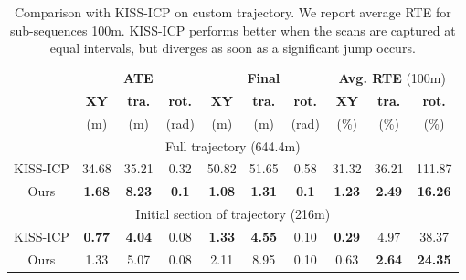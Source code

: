 \begin{table}[h]
    \centering
    {\small
        \begin{tabular}{c|ccc|ccc|ccc}
            \hline
                     & \multicolumn{3}{c|}{\textbf{ATE}} & \multicolumn{3}{c|}{\textbf{Final}} & \multicolumn{3}{c}{\textbf{Avg. RTE} (100m)}                                                                                                  \\
                     & \textbf{XY}                       & \textbf{tra.}                       & \textbf{rot.}                                & \textbf{XY}   & \textbf{tra.} & \textbf{rot.} & \textbf{XY}   & \textbf{tra.} & \textbf{rot.}  \\
                     & (m)                               & (m)                                 & (rad)                                        & (m)           & (m)           & (rad)         & (\%)          & (\%)          & (\%)           \\
            \hline
            \multicolumn{10}{c}{Full trajectory (644.4m)}                                                                                                                                                                                      \\
            \hline
            KISS-ICP & 34.68                             & 35.21                               & 0.32                                         & 50.82         & 51.65         & 0.58          & 31.32         & 36.21         & 111.87         \\
            Ours     & \textbf{1.68}                     & \textbf{8.23}                       & \textbf{0.1}                                 & \textbf{1.08} & \textbf{1.31} & \textbf{0.1}  & \textbf{1.23} & \textbf{2.49} & \textbf{16.26} \\
            \hline
            \multicolumn{10}{c}{Initial section of trajectory (216m)}                                                                                                                                                                          \\
            \hline
            KISS-ICP & \textbf{0.77}                     & \textbf{4.04}                       & 0.08                                         & \textbf{1.33} & \textbf{4.55} & 0.10          & \textbf{0.29} & 4.97          & 38.37          \\
            Ours     & 1.33                              & 5.07                                & 0.08                                         & 2.11          & 8.95          & 0.10          & 0.63          & \textbf{2.64} & \textbf{24.35} \\
            \hline
        \end{tabular}
    }
    \caption{Comparison with KISS-ICP \cite{vizzo2023ral} on custom trajectory. We report average RTE for sub-sequences 100m. KISS-ICP performs better when the scans are captured at equal intervals, but diverges as soon as a significant jump occurs.}
    \label{tab:custom-traj-results}
\end{table}

